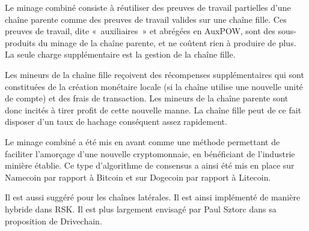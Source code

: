 %
%
%

Le minage combiné consiste à réutiliser des preuves de travail partielles d'une chaîne parente comme des preuves de travail valides sur une chaîne fille. Ces preuves de travail, dite «~auxiliaires~» et abrégées en AuxPOW, sont des sous-produits du minage de la chaîne parente, et ne coûtent rien à produire de plus. La seule charge supplémentaire est la gestion de la chaîne fille.

Les mineurs de la chaîne fille reçoivent des récompenses supplémentaires qui sont constituées de la création monétaire locale (si la chaîne utilise une nouvelle unité de compte) et des frais de transaction. Les mineurs de la chaîne parente sont donc incités à tirer profit de cette nouvelle manne. La chaîne fille peut de ce fait disposer d'un taux de hachage conséquent assez rapidement.

Le minage combiné a été mis en avant comme une méthode permettant de faciliter l'amorçage d'une nouvelle cryptomonnaie, en bénéficiant de l'industrie minière établie. Ce type d'algorithme de consensus a ainsi été mis en place sur Namecoin par rapport à Bitcoin et sur Dogecoin par rapport à Litecoin.

Il est aussi suggéré pour les chaînes latérales. Il est ainsi implémenté de manière hybride dans RSK. Il est plus largement envisagé par Paul Sztorc dans sa proposition de Drivechain.


